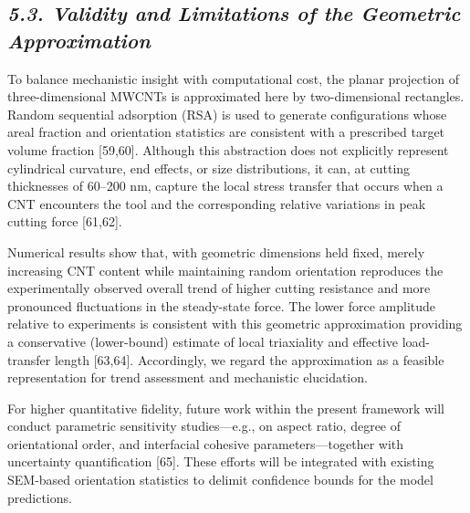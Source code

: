 \documentclass{article}
\begin{document}

\subsection*{\emph{5.3. Validity and Limitations of the Geometric Approximation}}

To balance mechanistic insight with computational cost, the planar projection of three-dimensional MWCNTs is approximated here by two-dimensional rectangles. Random sequential adsorption (RSA) is used to generate configurations whose areal fraction and orientation statistics are consistent with a prescribed target volume fraction [59,60]. Although this abstraction does not explicitly represent cylindrical curvature, end effects, or size distributions, it can, at cutting thicknesses of 60–200 nm, capture the local stress transfer that occurs when a CNT encounters the tool and the corresponding relative variations in peak cutting force [61,62].

Numerical results show that, with geometric dimensions held fixed, merely increasing CNT content while maintaining random orientation reproduces the experimentally observed overall trend of higher cutting resistance and more pronounced fluctuations in the steady-state force. The lower force amplitude relative to experiments is consistent with this geometric approximation providing a conservative (lower-bound) estimate of local triaxiality and effective load-transfer length [63,64]. Accordingly, we regard the approximation as a feasible representation for trend assessment and mechanistic elucidation.

For higher quantitative fidelity, future work within the present framework will conduct parametric sensitivity studies—e.g., on aspect ratio, degree of orientational order, and interfacial cohesive parameters—together with uncertainty quantification [65]. These efforts will be integrated with existing SEM-based orientation statistics to delimit confidence bounds for the model predictions.
\end{document}
